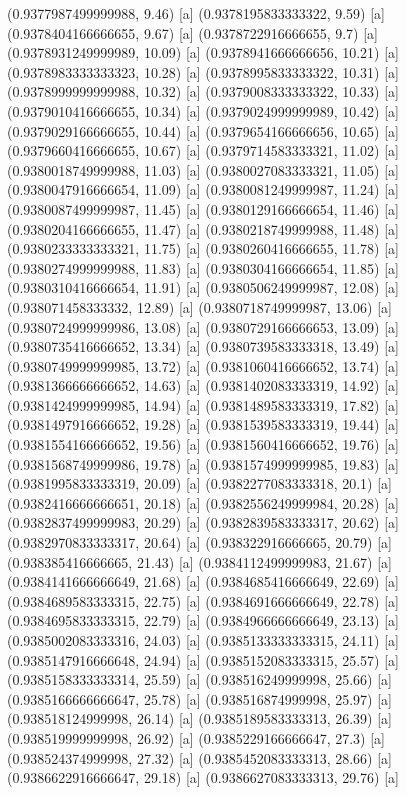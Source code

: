{{{(0.9377987499999988, 9.46) [a] 
(0.9378195833333322, 9.59) [a] 
(0.9378404166666655, 9.67) [a] 
(0.9378722916666655, 9.7) [a] 
(0.9378931249999989, 10.09) [a] 
(0.9378941666666656, 10.21) [a] 
(0.9378983333333323, 10.28) [a] 
(0.9378995833333322, 10.31) [a] 
(0.9378999999999988, 10.32) [a] 
(0.9379008333333322, 10.33) [a] 
(0.9379010416666655, 10.34) [a] 
(0.9379024999999989, 10.42) [a] 
(0.9379029166666655, 10.44) [a] 
(0.9379654166666656, 10.65) [a] 
(0.9379660416666655, 10.67) [a] 
(0.9379714583333321, 11.02) [a] 
(0.9380018749999988, 11.03) [a] 
(0.9380027083333321, 11.05) [a] 
(0.9380047916666654, 11.09) [a] 
(0.9380081249999987, 11.24) [a] 
(0.9380087499999987, 11.45) [a] 
(0.9380129166666654, 11.46) [a] 
(0.9380204166666655, 11.47) [a] 
(0.9380218749999988, 11.48) [a] 
(0.9380233333333321, 11.75) [a] 
(0.9380260416666655, 11.78) [a] 
(0.9380274999999988, 11.83) [a] 
(0.9380304166666654, 11.85) [a] 
(0.9380310416666654, 11.91) [a] 
(0.9380506249999987, 12.08) [a] 
(0.938071458333332, 12.89) [a] 
(0.9380718749999987, 13.06) [a] 
(0.9380724999999986, 13.08) [a] 
(0.9380729166666653, 13.09) [a] 
(0.9380735416666652, 13.34) [a] 
(0.9380739583333318, 13.49) [a] 
(0.9380749999999985, 13.72) [a] 
(0.9381060416666652, 13.74) [a] 
(0.9381366666666652, 14.63) [a] 
(0.9381402083333319, 14.92) [a] 
(0.9381424999999985, 14.94) [a] 
(0.9381489583333319, 17.82) [a] 
(0.9381497916666652, 19.28) [a] 
(0.9381539583333319, 19.44) [a] 
(0.9381554166666652, 19.56) [a] 
(0.9381560416666652, 19.76) [a] 
(0.9381568749999986, 19.78) [a] 
(0.9381574999999985, 19.83) [a] 
(0.9381995833333319, 20.09) [a] 
(0.9382277083333318, 20.1) [a] 
(0.9382416666666651, 20.18) [a] 
(0.9382556249999984, 20.28) [a] 
(0.9382837499999983, 20.29) [a] 
(0.9382839583333317, 20.62) [a] 
(0.9382970833333317, 20.64) [a] 
(0.938322916666665, 20.79) [a] 
(0.938385416666665, 21.43) [a] 
(0.9384112499999983, 21.67) [a] 
(0.9384141666666649, 21.68) [a] 
(0.9384685416666649, 22.69) [a] 
(0.9384689583333315, 22.75) [a] 
(0.9384691666666649, 22.78) [a] 
(0.9384695833333315, 22.79) [a] 
(0.9384966666666649, 23.13) [a] 
(0.9385002083333316, 24.03) [a] 
(0.9385133333333315, 24.11) [a] 
(0.9385147916666648, 24.94) [a] 
(0.9385152083333315, 25.57) [a] 
(0.9385158333333314, 25.59) [a] 
(0.938516249999998, 25.66) [a] 
(0.9385166666666647, 25.78) [a] 
(0.938516874999998, 25.97) [a] 
(0.938518124999998, 26.14) [a] 
(0.9385189583333313, 26.39) [a] 
(0.938519999999998, 26.92) [a] 
(0.9385229166666647, 27.3) [a] 
(0.938524374999998, 27.32) [a] 
(0.9385452083333313, 28.66) [a] 
(0.9386622916666647, 29.18) [a] 
(0.9386627083333313, 29.76) [a] 
}}}
